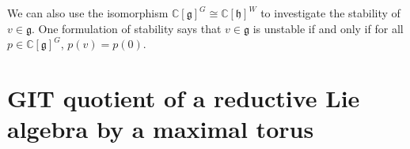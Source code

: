 \documentclass[12pt]{amsart}
\newcommand{\C}{\mathbb{C}}
\newcommand{\g}{\mathfrak{g}}
\newcommand{\h}{\mathfrak{h}}
\theoremstyle{remark}
\theoremstyle{remark}
\theoremstyle{remark}
\begin{document}
We can also use the isomorphism $\C[\g]^G \cong \C[\h]^W$ to investigate the stability of $v \in \g$.
One formulation of stability says that $v \in \g$ is unstable if and only if for all $p \in \C[\g]^G$, $p(v) = p(0)$.

\section{GIT quotient of a reductive Lie algebra by a maximal torus}
\end{document}
